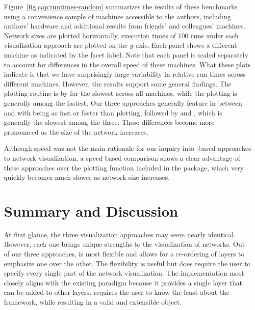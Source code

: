 Figure~\ref{fig.cap:runtimes-random} summarizes the results of these benchmarks using a convenience sample of machines accessible to the authors, including authors' hardware and additional results from friends' and colleagues' machines.
Network sizes are plotted horizontally, execution times of 100 runs under each visualization approach are plotted on the $y$-axis. Each panel shows a different machine as indicated by the facet label. Note that each panel is scaled separately to account for differences in the overall speed of these machines.
What these plots indicate is that we have surprisingly large variability in relative run times across different machines.
However, the results support some  general findings.
The  plotting routine is by far the slowest across all machines, while the  plotting is generally among the fastest. Our three approaches generally feature in between  and  with  being as fast or faster than  plotting, followed by  and , which is generally the slowest among the three. These differences become more pronounced as the size of the network increases.


Although speed was not the main rationale for our inquiry into -based approaches to network visualization, a speed-based comparison shows a clear advantage of these approaches over the plotting function included in the  package, which very quickly becomes much slower as network size increases.



\section{Summary and Discussion}



At first  glance, the three visualization approaches may seem nearly identical.
However, %
each one brings unique strengths to the visualization of networks.   Out of our three approaches,  is most flexible and allows for a re-ordering of layers to emphasize one over the other. The flexibility is useful but does require the user to specify every single part of the network visualization. The  implementation most closely aligns with the existing  paradigm because it provides a single layer that can be added to other  layers.  requires the user to know the least about the  framework, while resulting in a valid and extensible  object. %

